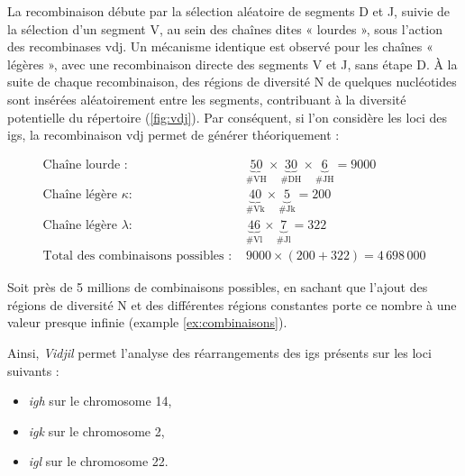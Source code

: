 \vspace{1em}

La recombinaison débute par la sélection aléatoire de segments D et J, suivie
de la sélection d'un segment V, au sein des chaînes dites « lourdes », sous
l'action des recombinases \gls{vdj}. Un mécanisme identique est observé pour
les chaînes « légères », avec une recombinaison directe des segments V et J,
sans étape D. À la suite de chaque recombinaison, des régions de diversité N de
quelques nucléotides sont insérées aléatoirement entre les segments,
contribuant à la diversité potentielle du répertoire (\autoref{fig:vdj}). Par
conséquent, si l'on considère les loci des \glspl{ig}, la recombinaison
\gls{vdj} permet de générer théoriquement :

\begin{examplebox}[label={ex:combinaisons}]
    \begin{equation}
        \begin{aligned}
            \text{Chaîne lourde : }                    & \underbrace{50}_{\text{\# VH}} \times \underbrace{30}_{\text{\# DH}} \times \underbrace{6}_{\text{\# JH}} = 9000 \\
            \text{Chaîne légère } \kappa :             & \underbrace{40}_{\text{\# Vk}} \times \underbrace{5}_{\text{\# Jk}} = 200                                        \\
            \text{Chaîne légère } \lambda :            & \underbrace{46}_{\text{\# Vl}} \times \underbrace{7}_{\text{\# Jl}} = 322                                        \\
            \text{Total des combinaisons possibles : } & 9000 \times (200 + 322) = 4\,698\,000
        \end{aligned}
    \end{equation}
\end{examplebox}

Soit près de 5 millions de combinaisons possibles, en sachant que l'ajout des
régions de diversité N et des différentes régions constantes porte ce nombre à
une valeur presque infinie (example \autoref{ex:combinaisons}).

\vspace{1em}

Ainsi, \textit{Vidjil} permet l'analyse des réarrangements des \glspl{ig}
présents sur les loci suivants :
\begin{itemize}
    \item \textit{\gls{igh}} sur le chromosome 14,
    \item \textit{\gls{igk}} sur le chromosome 2,
    \item \textit{\gls{igl}} sur le chromosome 22.
\end{itemize}


